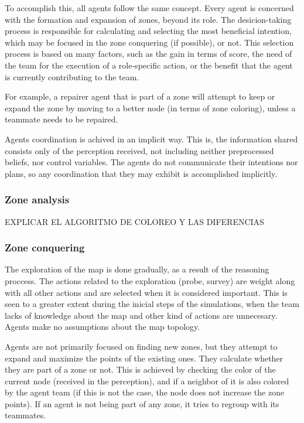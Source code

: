 \documentclass{llncs2e/llncs}
\begin{document}
    To accomplish this, all agents follow the same concept. Every agent is concerned 
    with the formation and expansion of zones, beyond its role.
    The desicion-taking process is responsible for calculating and selecting the
    most beneficial intention, which may be focused in the zone conquering (if possible),
    or not.
    This selection process is based on many factors, such as the gain in terms 
    of score, the need of the team for the execution of a role-specific action, or
    the benefit that the agent is currently contributing to the team. 
    
    For example, a repairer agent that is part of a zone will attempt to keep or
    expand the zone by moving to a better node (in terms of zone coloring), 
    unless a teammate needs to be repaired.
    
    Agents coordination is achived in an implicit way. This is, the information
    shared consists only of the perception received, not including neither 
    preprocessed beliefs, nor control variables. The agents do not communicate
    their intentions nor plans, so any coordination that they may exhibit is 
    accomplished implicitly.
       
\subsubsection{Zone analysis}

    EXPLICAR EL ALGORITMO DE COLOREO Y LAS DIFERENCIAS 

\subsubsection{Zone conquering}
    
    The exploration of the map is done gradually, as a result of the reasoning 
    proccess. The actions related to the exploration (probe, survey) are weight 
    along with all other actions and are selected when it is considered important. 
    This is seen to a greater extent during the inicial steps of the simulations, 
    when the team lacks of knowledge about the map and other kind of actions are 
    unnecesary. Agents make no assumptions about the map topology.

    Agents are not primarily focused on finding new zones, but they attempt to 
    expand and maximize the points of the existing ones.    
    They calculate whether they are part of a zone or not. This is achieved
    by checking the color of the current node (received in the perception), and if
    a neighbor of it is also colored by the agent team (if this is not the case, the 
    node does not increase the zone points).
    If an agent is not being part of any zone, it tries to regroup with its 
    teammates. 
\end{document}
